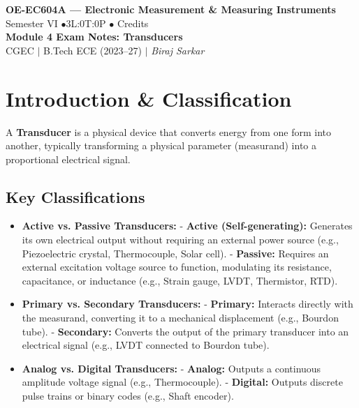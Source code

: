 \documentclass[12pt,a4paper]{article}
\begin{document}

\begin{center}
  {\LARGE\bfseries\color{myred} OE-EC604A --- Electronic Measurement \& Measuring Instruments}\\[5pt]
  {\normalsize\color{mydark} Semester VI \quad$\bullet$\quad 3L:0T:0P \quad$\bullet$ Credits}\\[3pt]
  {\normalsize\color{myteal}\textbf{Module 4 Exam Notes: Transducers}}\\[3pt]
  {\small\color{mydark} CGEC \;$|$\; B.Tech ECE (2023--27) \;$|$\; \textit{Biraj Sarkar}}
\end{center}
\vspace{2pt}
\noindent{\color{myred}\rule{\linewidth}{1.5pt}}
\vspace{2pt}

\hypersetup{linkcolor=mydark}
\tableofcontents
\hypersetup{linkcolor=myteal}
\newpage

\section{Introduction \& Classification}

A \textbf{Transducer} is a physical device that converts energy from one form into another, typically transforming a physical parameter (measurand) into a proportional electrical signal.

\subsection{Key Classifications}
\begin{itemize}[leftmargin=*, itemsep=3.5pt]
  \item \textbf{Active vs. Passive Transducers:}
    - \textbf{Active (Self-generating):} Generates its own electrical output without requiring an external power source (e.g., Piezoelectric crystal, Thermocouple, Solar cell).
    - \textbf{Passive:} Requires an external excitation voltage source to function, modulating its resistance, capacitance, or inductance (e.g., Strain gauge, LVDT, Thermistor, RTD).
  \item \textbf{Primary vs. Secondary Transducers:}
    - \textbf{Primary:} Interacts directly with the measurand, converting it to a mechanical displacement (e.g., Bourdon tube).
    - \textbf{Secondary:} Converts the output of the primary transducer into an electrical signal (e.g., LVDT connected to Bourdon tube).
  \item \textbf{Analog vs. Digital Transducers:}
    - \textbf{Analog:} Outputs a continuous amplitude voltage signal (e.g., Thermocouple).
    - \textbf{Digital:} Outputs discrete pulse trains or binary codes (e.g., Shaft encoder).
\end{itemize}
\end{document}
